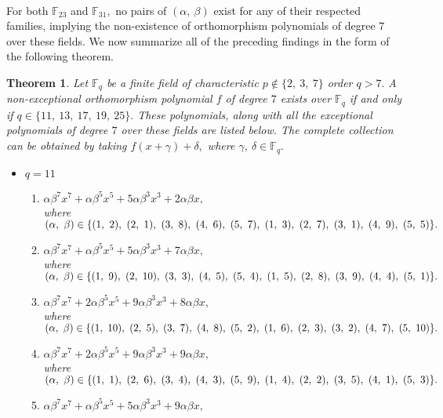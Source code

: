 \documentclass[12pt,a4wide, reqno]{amsart}
\newtheorem{theorem}{Theorem}[section]
\theoremstyle{definition}
\theoremstyle{remark}
\numberwithin{equation}{section}
\begin{document}
\vspace{0.2cm}\\
For both $\mathbb{F}_{23}$ and $\mathbb{F}_{31},$ no pairs of $(\alpha,~\beta)$ exist for any of their respected families, implying the non-existence of orthomorphism polynomials of degree $7$ over these fields.
We now summarize all of the preceding findings in the form of the following theorem.
\begin{theorem}\label{thm3.1}
    Let $\mathbb{F}_q$ be a finite field of characteristic $p\notin\{2,~3,~7\}$ order $q> 7.$ A non-exceptional orthomorphism polynomial $f$ of degree $7$ exists over $\mathbb{F}_q$ if and only if $q\in\{11,~13,~17,~19,~25\}.$ These polynomials, along with all the exceptional polynomials of degree $7$ over these fields are listed below. The complete collection can be obtained by taking $f(x+\gamma)+\delta,$ where $\gamma,~\delta\in\mathbb{F}_q.$
    \begin{itemize}
        \item 
        $q=11$
        \begin{enumerate}[label=\textup{(\arabic*)}]
        \item 
        $\alpha\beta^7x^7+\alpha\beta^5x^5+5\alpha\beta^3x^3+2\alpha\beta x,$ \\
        where $(\alpha,~\beta)\in\{(1,~2),~(2,~1),~(3,~8),~(4,~6),~(5,~7),~(1,~3),~(2,~7),~(3,~1),~(4,~9),\\~(5,~5)\}.$
        \item 
        $\alpha\beta^7x^7+\alpha\beta^5x^5+5\alpha\beta^3x^3+7\alpha\beta x,$\\ where $(\alpha,~\beta)\in\{(1,~9),~(2,~10),~(3,~3),~(4,~5),~(5,~4),~(1,~5),~(2,~8),~(3,~9),~(4,~4),\\~(5,~1)\}.$
        \item 
        $\alpha\beta^7x^7+2\alpha\beta^5x^5+9\alpha\beta^3x^3+8\alpha\beta x,$\\
        where $(\alpha,~\beta)\in\{(1,~10),~(2,~5),~(3,~7),~(4,~8),~(5,~2),~(1,~6),~(2,~3),~(3,~2),~(4,~7),\\~(5,~10)\}.$
        \item 
        $\alpha\beta^7x^7+2\alpha\beta^5x^5+9\alpha\beta^3x^3+9\alpha\beta x,$\\
        where $(\alpha,~\beta)\in\{(1,~1),~(2,~6),~(3,~4),~(4,~3),~(5,~9),~(1,~4),~(2,~2),~(3,~5),~(4,~1),\\~(5,~3)\}.$
        \item 
        $\alpha\beta^7x^7+\alpha\beta^5x^5+5\alpha\beta^3x^3+9\alpha\beta x,$\\

\end{enumerate}
\end{itemize}
\end{theorem}
\end{document}
